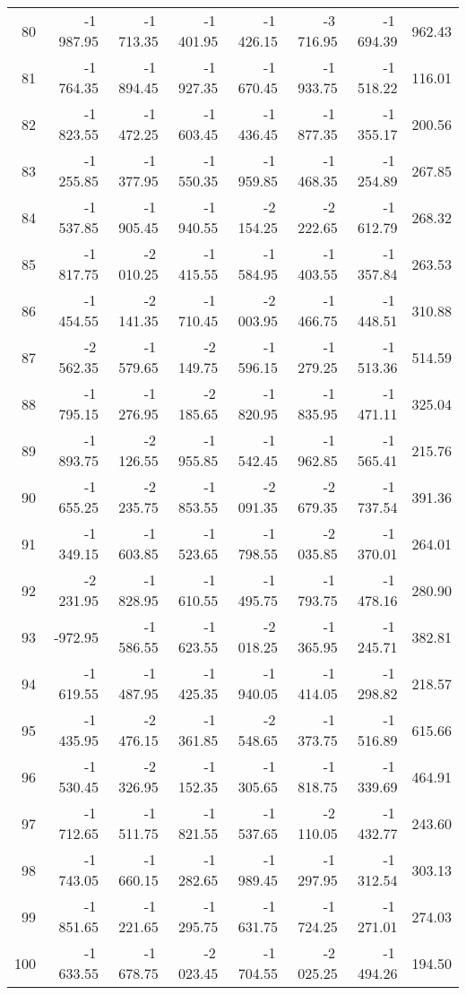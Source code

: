 \begin{longtable}{rrrrrrrr}
80 & -1\,987.95 & -1\,713.35 & -1\,401.95 & -1\,426.15 & -3\,716.95 & -1\,694.39 & 962.43  \\
81 & -1\,764.35 & -1\,894.45 & -1\,927.35 & -1\,670.45 & -1\,933.75 & -1\,518.22 & 116.01  \\
82 & -1\,823.55 & -1\,472.25 & -1\,603.45 & -1\,436.45 & -1\,877.35 & -1\,355.17 & 200.56  \\
83 & -1\,255.85 & -1\,377.95 & -1\,550.35 & -1\,959.85 & -1\,468.35 & -1\,254.89 & 267.85  \\
84 & -1\,537.85 & -1\,905.45 & -1\,940.55 & -2\,154.25 & -2\,222.65 & -1\,612.79 & 268.32  \\
85 & -1\,817.75 & -2\,010.25 & -1\,415.55 & -1\,584.95 & -1\,403.55 & -1\,357.84 & 263.53  \\
86 & -1\,454.55 & -2\,141.35 & -1\,710.45 & -2\,003.95 & -1\,466.75 & -1\,448.51 & 310.88  \\
87 & -2\,562.35 & -1\,579.65 & -2\,149.75 & -1\,596.15 & -1\,279.25 & -1\,513.36 & 514.59  \\
88 & -1\,795.15 & -1\,276.95 & -2\,185.65 & -1\,820.95 & -1\,835.95 & -1\,471.11 & 325.04  \\
89 & -1\,893.75 & -2\,126.55 & -1\,955.85 & -1\,542.45 & -1\,962.85 & -1\,565.41 & 215.76  \\
90 & -1\,655.25 & -2\,235.75 & -1\,853.55 & -2\,091.35 & -2\,679.35 & -1\,737.54 & 391.36  \\
91 & -1\,349.15 & -1\,603.85 & -1\,523.65 & -1\,798.55 & -2\,035.85 & -1\,370.01 & 264.01  \\
92 & -2\,231.95 & -1\,828.95 & -1\,610.55 & -1\,495.75 & -1\,793.75 & -1\,478.16 & 280.90  \\
93 & -972.95 & -1\,586.55 & -1\,623.55 & -2\,018.25 & -1\,365.95 & -1\,245.71 & 382.81  \\
94 & -1\,619.55 & -1\,487.95 & -1\,425.35 & -1\,940.05 & -1\,414.05 & -1\,298.82 & 218.57  \\
95 & -1\,435.95 & -2\,476.15 & -1\,361.85 & -2\,548.65 & -1\,373.75 & -1\,516.89 & 615.66  \\
96 & -1\,530.45 & -2\,326.95 & -1\,152.35 & -1\,305.65 & -1\,818.75 & -1\,339.69 & 464.91  \\
97 & -1\,712.65 & -1\,511.75 & -1\,821.55 & -1\,537.65 & -2\,110.05 & -1\,432.77 & 243.60  \\
98 & -1\,743.05 & -1\,660.15 & -1\,282.65 & -1\,989.45 & -1\,297.95 & -1\,312.54 & 303.13  \\
99 & -1\,851.65 & -1\,221.65 & -1\,295.75 & -1\,631.75 & -1\,724.25 & -1\,271.01 & 274.03  \\
100 & -1\,633.55 & -1\,678.75 & -2\,023.45 & -1\,704.55 & -2\,025.25 & -1\,494.26 & 194.50  \\

\end{longtable}


